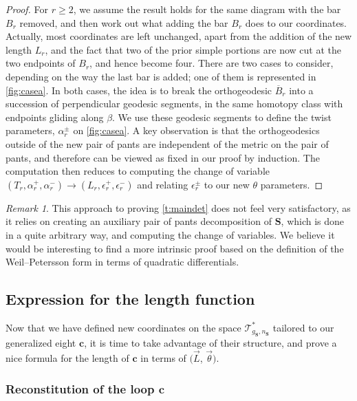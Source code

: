 \documentclass[12pt,twoside]{article}
\theoremstyle{theorem}
\theoremstyle{remark}
\newtheorem{rem}[thm]{Remark}
\theoremstyle{definition}
\theoremstyle{example}
\newcommand{\1}[1]{\mathds{1}_{#1}}
\newcommand{\cT}{\mathcal{T}}
\newcommand{\Sf}{\mathbf{S}}
\newcommand{\g}{g_{\mathbf{S}}}
\newcommand{\n}{n_{\mathbf{S}}}
\newcommand{\curve}{\mathbf{c}}
\begin{document}
\begin{proof}
  For $r \geq 2$, we assume the result holds for the same diagram with the bar $B_r$ removed, and
  then work out what adding the bar $B_r$ does to our coordinates. Actually, most coordinates are
  left unchanged, apart from the addition of the new length $L_r$, and the fact that two of the
  prior simple portions are now cut at the two endpoints of $B_r$, and hence become four.  There are
  two cases to consider, depending on the way the last bar is added; one of them is represented in
  \cref{fig:casea}. In both cases, the idea is to break the orthogeodesic $\overline{B}_r$ into a
  succession of perpendicular geodesic segments, in the same homotopy class with endpoints gliding
  along $\beta$. We use these geodesic segments to define the twist parameters, $\alpha_r^\pm$ on
  \cref{fig:casea}. A key observation is that the orthogeodesics outside of the new pair of pants
  are independent of the metric on the pair of pants, and therefore can be viewed as fixed in our
  proof by induction. The computation then reduces to computing the change of variable
  $(T_r,\alpha_r^+,\alpha_r^-) \rightarrow (L_r,\epsilon_r^+,\epsilon_r^-)$ and relating
  $\epsilon_r^\pm$ to our new $\theta$ parameters.
\end{proof}

\begin{rem}
  This approach to proving \cref{t:maindet} does not feel very
satisfactory, as it relies on creating an auxiliary pair of pants decomposition of $\Sf$, which is
done in a quite arbitrary way, and computing the change of variables. We believe it would be
interesting to find a more intrinsic proof based on the definition of the Weil--Petersson form in
terms of quadratic differentials.
\end{rem}

\subsection{Expression for the length function}
\label{sec:expr-length-funct}

Now that we have defined new coordinates on the space $\cT_{\g,\n}^*$ tailored to our generalized
eight $\mathbf{c}$, it is time to take advantage of their structure, and prove a nice formula for
the length of $\mathbf{c}$ in terms of $(\vec{L}$, $\vec{\theta})$.

\subsubsection{Reconstitution of the loop $\curve$}
\label{s:straightening2}
\end{document}

